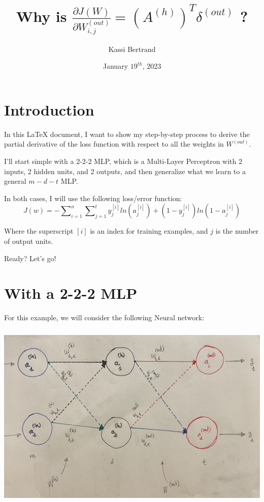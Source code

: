\documentclass[12pt, letterpaper]{article}
\title{Why is $ \frac{\partial J(W)}{\partial W_{i,j}^{(out)}} = (A^{(h)})^{T} \delta^{(out)}$ ?}
\author{Kassi Bertrand}
\date{January $19^{th}$, 2023}
\begin{document}
\maketitle

\section{Introduction}
In this \LaTeX{} document, I want to show my step-by-step process
to derive the partial derivative of the loss function with respect
to all the weights in $W^{(out)}$.

\vspace{5mm} %

I'll start simple with a 2-2-2 MLP, which is a Multi-Layer Perceptron
with 2 inputs, 2 hidden units, and 2 outputs, and then generalize
what we learn to a general $m-d-t$ MLP.

\vspace{5mm} %

In both cases, I will use the following loss/error function:
\[J(w) = -\sum\nolimits_{i = 1}^{n}\sum\nolimits_{j=1}^{t} y_j^{[i]} ln(a_j^{[i]}) + (1 - y_j^{[i]})ln(1 - a_j^{[i]})\]

Where the superscript $[i]$ is an index for training examples,
and $j$ is the number of output units.

\vspace{5mm} %

Ready? Let's go!

\pagebreak
\section{With a 2-2-2 MLP}

For this example, we will consider the following Neural network:

\begin{center}
    \includegraphics[width = 16cm, height = 9cm]{2-2-2-mlp.jpg}
\end{center}
\end{document}
